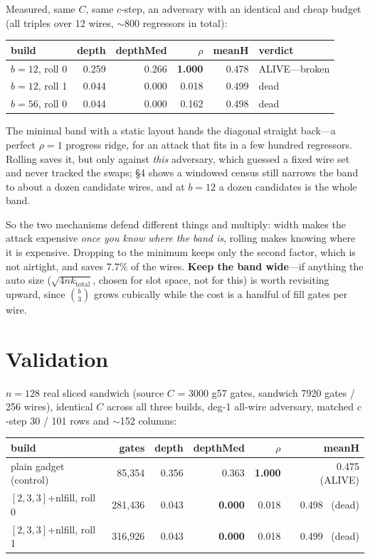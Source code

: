 \documentclass[11pt]{article}
\begin{document}
Measured, same $C$, same $c$-step, an adversary with an identical and cheap
budget (all triples over 12 wires, $\sim$800 regressors in total):

\begin{center}
\begin{tabular}{lrrrrl}
\toprule
build & depth & depthMed & $\rho$ & meanH & verdict \\
\midrule
$b{=}12$, roll 0 & 0.259 & 0.266 & \textbf{1.000} & 0.478 & ALIVE---broken \\
$b{=}12$, roll 1 & 0.044 & 0.000 & 0.018 & 0.499 & dead \\
$b{=}56$, roll 0 & 0.044 & 0.000 & 0.162 & 0.498 & dead \\
\bottomrule
\end{tabular}
\end{center}

The minimal band with a static layout hands the diagonal straight back---a
perfect $\rho=1$ progress ridge, for an attack that fits in a few hundred
regressors. Rolling saves it, but only against \emph{this} adversary, which
guessed a fixed wire set and never tracked the swaps; §4 shows a windowed
census still narrows the band to about a dozen candidate wires, and at $b{=}12$
a dozen candidates is the whole band.

So the two mechanisms defend different things and multiply: width makes the
attack expensive \emph{once you know where the band is}, rolling makes knowing
where it is expensive. Dropping to the minimum keeps only the second factor,
which is not airtight, and saves 7.7\% of the wires. \textbf{Keep the band
wide}---if anything the auto size ($\sqrt{4nk_{\mathrm{total}}}$, chosen for
slot space, not for this) is worth revisiting upward, since $\binom{b}{3}$
grows cubically while the cost is a handful of fill gates per wire.

\section{Validation}

$n{=}128$ real sliced sandwich (source $C$ = 3000 g57 gates, sandwich 7920
gates / 256 wires), identical $C$ across all three builds, deg-1 all-wire
adversary, matched $c$-step 30 / 101 rows and $\sim$152 columns:

\begin{center}
\begin{tabular}{lrrrrr}
\toprule
build & gates & depth & depthMed & $\rho$ & meanH \\
\midrule
plain gadget (control) & 85{,}354 & 0.356 & 0.363 & \textbf{1.000} & 0.475 \ (ALIVE) \\
$[2,3,3]$+nlfill, roll 0 & 281{,}436 & 0.043 & \textbf{0.000} & 0.018 & 0.498 \ (dead) \\
$[2,3,3]$+nlfill, roll 1 & 316{,}926 & 0.043 & \textbf{0.000} & 0.018 & 0.499 \ (dead) \\
\bottomrule
\end{tabular}
\end{center}
\end{document}
